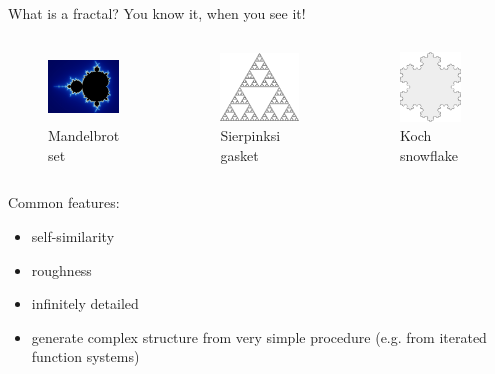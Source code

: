 \begin{frame}{What is a fractal?}
    You know it, when you see it!

    \begin{columns}[c]
        \begin{figure}
            \centering
            \includegraphics[height=5em]{images/mandelbrot.pdf}
            \caption{Mandelbrot set}
        \end{figure}
        \begin{figure}
            \centering
            \includegraphics[height=5em]{images/sierpinksi.pdf}
            \caption{Sierpinksi gasket}
        \end{figure}
        \begin{figure}
            \centering
            \includegraphics[height=5em]{images/snowflake.pdf}
            \caption{Koch snowflake}
        \end{figure}
    \end{columns}

    Common features: 
    \begin{itemize}
        \item self-similarity
        \item roughness
        \item infinitely detailed
        \item generate complex structure from very simple procedure (e.g. from iterated function systems)
    \end{itemize}
\end{frame}

